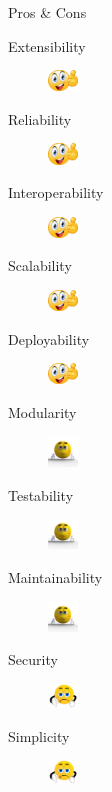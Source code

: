 \documentclass{slide}
\begin{document}
\begin{frame}{Pros \& Cons}
    \vspace{1mm}
    {\LARGE
    \begin{description}
        \item[Extensibility] \tabto{15em}\includegraphics[width=8mm]{../../shared/images/thumbs-up.png}
        \item[Reliability] \tabto{15em}\includegraphics[width=8mm]{../../shared/images/thumbs-up.png}
        \item[Interoperability] \tabto{15em}\includegraphics[width=8mm]{../../shared/images/thumbs-up.png}
        \item[Scalability] \tabto{15em}\includegraphics[width=8mm]{../../shared/images/thumbs-up.png}
        \item[Deployability] \tabto{15em}\includegraphics[width=8mm]{../../shared/images/thumbs-up.png}
        \item[Modularity] \tabto{15em}\includegraphics[width=8mm]{../../shared/images/neutral.png}
        \item[Testability] \tabto{15em}\includegraphics[trim=22 19 22 12,clip,width=8mm]{../../shared/images/neutral.png}
        \item[Maintainability] \tabto{15em}\includegraphics[trim=22 19 22 12,clip,width=8mm]{../../shared/images/neutral.png}
        \item[Security] \tabto{15em}\includegraphics[trim=22 19 22 12,clip,width=8mm]{../../shared/images/thumbs-down.png}
        \item[Simplicity] \tabto{15em}\includegraphics[trim=22 19 22 12,clip,width=8mm]{../../shared/images/thumbs-down.png}
    \end{description}
    }
\end{frame}
\end{document}
